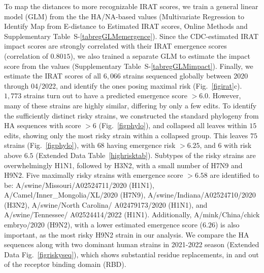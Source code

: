 \documentclass[onecolumn, compsoc,12pt]{IEEEtran}
\def\SUPPLEMENTARY{Supplementary\xspace}
\def\METHODS{Online Methods\xspace}
\def\EXTENDED{Extended Data\xspace}
\begin{document}
To map the \enet distances to  more recognizable IRAT scores, we  train a general linear model (GLM)  from the  the HA/NA-based \erisk values (Multivariate Regression to Identify Map from E-distance to Estimated IRAT scores, \METHODS and \SUPPLEMENTARY Table~S-\ref{tabregGLMemergence}). Since the CDC-estimated IRAT impact scores are strongly correlated with their IRAT emergence scores (correlation of $0.8015$), we also trained a separate GLM to estimate the impact score from the \erisk values (\SUPPLEMENTARY Table~S-\ref{tabregGLMimpact}).  Finally,  we estimate the  IRAT scores of all  $6,066$  \infl strains sequenced globally between 2020 through 04/2022, and identify the ones posing maximal risk (Fig.~\ref{figirat}c). $1,773$ strains turn out to have a predicted emergence score $>6.0$. However, many of these strains are highly similar, differing by only a few edits. To identify the sufficiently distinct risky strains, we constructed the standard phylogeny from  HA sequences with score $>6$ (Fig.~\ref{figphylo}), and collapsed all leaves within $15$ edits, showing only the most risky strain within a collapsed group. This leaves $75$ strains (Fig.~\ref{figphylo}), with $68$ having emergence risk $>6.25$, and $6$ with  risk above $6.5$ (\EXTENDED Table~\ref{highrisktab}). Subtypes of the   risky strains are overwhelmingly H1N1, followed by H3N2, with a  small number of H7N9 and H9N2. Five maximally risky strains with emergence score $>6.58$ are identified to be: 
A/swine/Missouri/A02524711/2020 (H1N1), A/Camel/Inner\_Mongolia/XL/2020 (H7N9), A/swine/Indiana/A02524710/2020 (H3N2), A/swine/North Carolina/ A02479173/2020 (H1N1), and A/swine/Tennessee/ A02524414/2022 (H1N1).  Additionally,  A/mink/China/chick embryo/2020 (H9N2),  with a lower estimated emergence score ($6.26$) is also important, as the most risky H9N2 strain in our analysis. We compare the HA sequences along with two dominant human strains in 2021-2022 season (\EXTENDED Fig.~\ref{figriskyseq}), which shows substantial residue replacements, in and out of the receptor binding domain (RBD).

\end{document}
